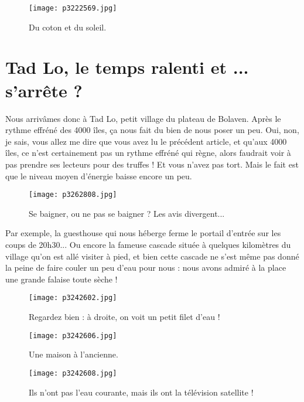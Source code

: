\documentclass{book}
\begin{document}
\begin{figure}[h]
\centering
\texttt{[image: p3222569.jpg]}
\caption*{Du coton et du soleil.}
\end{figure}



\chapter{Tad Lo, le temps ralenti et ... s'arrête ?}
Nous arrivâmes donc à Tad Lo, petit village du plateau de Bolaven. Après le rythme effréné des 4000 îles, ça nous fait du bien de nous poser un peu. Oui, non, je sais, vous allez me dire que vous avez lu le précédent article, et qu'aux 4000 îles, ce n'est certainement pas un rythme effréné qui règne, alors faudrait voir à pas prendre ses lecteurs pour des truffes ! Et vous n'avez pas tort. Mais le fait est que le niveau moyen d'énergie baisse encore un peu.


\begin{figure}[h]
\centering
\texttt{[image: p3262808.jpg]}
\caption*{Se baigner, ou ne pas se baigner ? Les avis divergent...}
\end{figure}

Par exemple, la guesthouse qui nous héberge ferme le portail d'entrée sur les coups de 20h30... Ou encore la fameuse cascade située à quelques kilomètres du village qu'on est allé visiter à pied, et bien cette cascade ne s'est même pas donné la peine de faire couler un peu d'eau pour nous : nous avons admiré à la place une grande falaise toute sèche !


\begin{figure}[h]
\centering
\texttt{[image: p3242602.jpg]}
\caption*{Regardez bien : à droite, on voit un petit filet d'eau !}
\end{figure}


\begin{figure}[h]
\centering
\texttt{[image: p3242606.jpg]}
\caption*{Une maison à l'ancienne.}
\end{figure}


\begin{figure}[h]
\centering
\texttt{[image: p3242608.jpg]}
\caption*{Ils n'ont pas l'eau courante, mais ils ont la télévision satellite !}
\end{figure}
\end{document}
